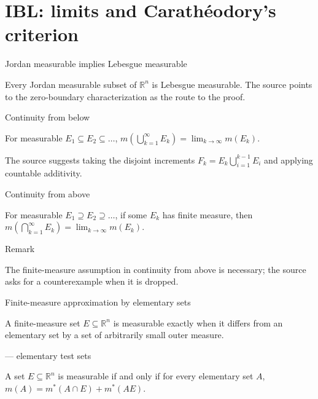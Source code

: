 \chapter{IBL: limits and Carathéodory's criterion}

\begin{theorem}{Jordan measurable implies Lebesgue measurable}

Every Jordan measurable subset of \(\mathbb{R}^{n}\) is Lebesgue measurable. The source points to the zero-boundary characterization as the route to the proof.

\end{theorem}

\begin{theorem}{Continuity from below}

For measurable \(E_{1} \subseteq E_{2} \subseteq \ldots\), \(m\left( {\bigcup_{k = 1}^{\infty}E_{k}} \right) = \lim_{k\rightarrow\infty}m\left( E_{k} \right)\).

\end{theorem}

The source suggests taking the disjoint increments \(F_{k} = E_{k}\bigcup_{i = 1}^{k - 1}E_{i}\) and applying countable additivity.

\begin{theorem}{Continuity from above}

For measurable \(E_{1} \supseteq E_{2} \supseteq \ldots\), if some \(E_{k}\) has finite measure, then \(m\left( {\bigcap_{k = 1}^{\infty}E_{k}} \right) = \lim_{k\rightarrow\infty}m\left( E_{k} \right)\).

\end{theorem}

\begin{qlremark}{Remark}

The finite-measure assumption in continuity from above is necessary; the source asks for a counterexample when it is dropped.

\end{qlremark}

\begin{theorem}{Finite-measure approximation by elementary sets}

A finite-measure set \(E \subseteq \mathbb{R}^{n}\) is measurable exactly when it differs from an elementary set by a set of arbitrarily small outer measure.

\end{theorem}

\begin{theorem}{ --- elementary test sets}

A set \(E \subseteq \mathbb{R}^{n}\) is measurable if and only if for every elementary set \(A\), \(m(A) = m^{\ast}\left( {A \cap E} \right) + m^{\ast}\left( {AE} \right)\).

\end{theorem}

